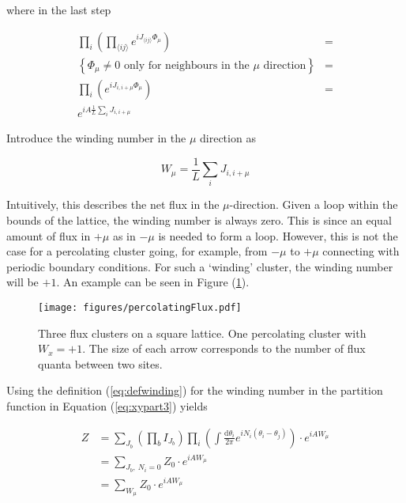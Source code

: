 where in the last step

\begin{align}
    \prod_i \left (\prod_{\langle ij \rangle} e^{i J_{\langle ij \rangle} \Phi_\mu} \right) &= \\
%
    \left\{ \text{$\Phi_\mu \neq 0$ only for neighbours in the $\mu$ direction} \right \} &= \\
%
    \prod_i \left ( e^{iJ_{i, i+\mu} \Phi_\mu} \right ) &= \\
%
    e^{iA \frac{1}{L} \sum_i J_{i, i+\mu}}
\end{align}

Introduce the winding number in the $\mu$ direction as

\begin{equation}
    W_\mu = \frac{1}{L} \sum_i J_{i, i+\mu}
\label{eq:defwinding}
\end{equation}

Intuitively, this describes the net flux in the $\mu$-direction. Given a loop within the bounds of the lattice, the winding number is always zero. This is since an equal amount of flux in $+\mu$ as in $-\mu$ is needed to form a loop. However, this is not the case for a percolating cluster going, for example, from $-\mu$ to $+\mu$ connecting with periodic boundary conditions. For such a `winding' cluster, the winding number will be $+1$. An example can be seen in Figure (\ref{fig:fluxpercolation}).

\begin{figure}[h!]
    \centering
        \texttt{[image: figures/percolatingFlux.pdf]}
    \caption{Three flux clusters on a square lattice. One percolating cluster with $W_x = +1$. The size of each arrow corresponds to the number of flux quanta between two sites.}
    \label{fig:fluxpercolation}
\end{figure}

Using the definition (\ref{eq:defwinding}) for the winding number in the partition function in Equation (\ref{eq:xypart3}) yields

\begin{align}
    Z &= \sum_{J_b} \left ( \prod_b I_{J_b} \right ) \prod_i \left ( \int \frac{\mathrm d \theta_i}{2 \pi} e^{i N_i (\theta_i - \theta_j)} \right ) \cdot e^{i A W_\mu} \\
    &= \sum_{J_b, \ N_i = 0} Z_0 \cdot e^{i A W_\mu} \\
    &= \sum_{W_\mu} Z_0 \cdot e^{i A W_\mu}
\end{align}

